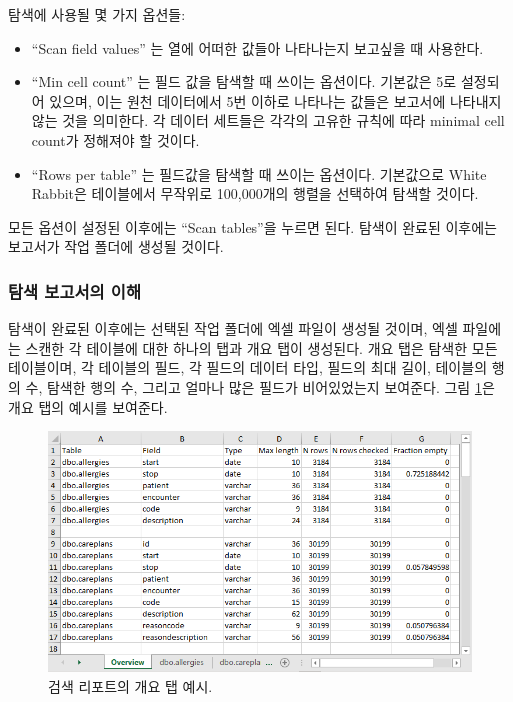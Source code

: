 \documentclass[11pt]{book}
\providecommand{\tightlist}{%
  \setlength{\itemsep}{0pt}\setlength{\parskip}{0pt}}
\theoremstyle{definition}
\theoremstyle{definition}
\theoremstyle{definition}
\theoremstyle{remark}
\begin{document}
탐색에 사용될 몇 가지 옵션들:

\begin{itemize}
\tightlist
\item
  ``Scan field values'' 는 열에 어떠한 값들아 나타나는지 보고싶을 때
  사용한다.
\item
  ``Min cell count'' 는 필드 값을 탐색할 때 쓰이는 옵션이다. 기본값은
  5로 설정되어 있으며, 이는 원천 데이터에서 5번 이하로 나타나는 값들은
  보고서에 나타내지 않는 것을 의미한다. 각 데이터 세트들은 각각의 고유한
  규칙에 따라 minimal cell count가 정해져야 할 것이다.
\item
  ``Rows per table'' 는 필드값을 탐색할 때 쓰이는 옵션이다. 기본값으로
  White Rabbit은 테이블에서 무작위로 100,000개의 행렬을 선택하여 탐색할
  것이다.
\end{itemize}

모든 옵션이 설정된 이후에는 ``Scan tables''을 누르면 된다. 탐색이 완료된
이후에는 보고서가 작업 폴더에 생성될 것이다.

\subsubsection*{탐색 보고서의 이해}\label{--}

탐색이 완료된 이후에는 선택된 작업 폴더에 엑셀 파일이 생성될 것이며,
엑셀 파일에는 스캔한 각 테이블에 대한 하나의 탭과 개요 탭이 생성된다.
개요 탭은 탐색한 모든 테이블이며, 각 테이블의 필드, 각 필드의 데이터
타입, 필드의 최대 길이, 테이블의 행의 수, 탐색한 행의 수, 그리고 얼마나
많은 필드가 비어있었는지 보여준다. 그림 \ref{fig:ScanOverviewTab}은 개요
탭의 예시를 보여준다.

\begin{figure}

{\centering \includegraphics[width=1\linewidth]{images/ExtractTransformLoad/ScanOverviewTab} 

}

\caption{검색 리포트의 개요 탭 예시.}\label{fig:ScanOverviewTab}
\end{figure}
\end{document}

